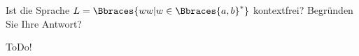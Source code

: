 
\begin{exercise}

Ist die Sprache $L = \Bbraces{w w | w \in \Bbraces{a, b}^\ast}$ kontextfrei?
Begründen Sie Ihre Antwort?

\end{exercise}


\begin{solution}

ToDo!

\end{solution}

